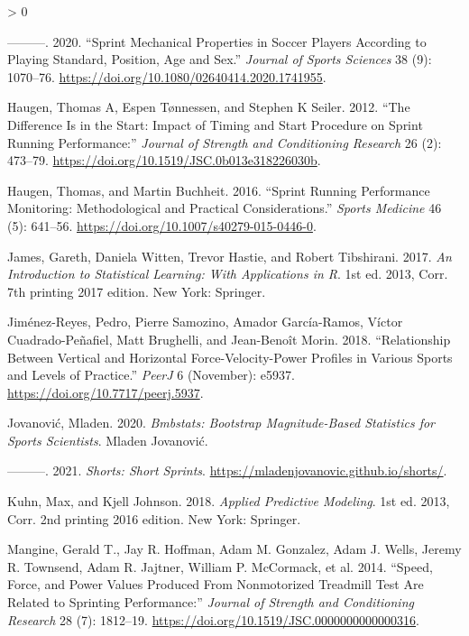 \documentclass[fleqn,10pt]{wlpeerj} %
\newlength{\cslhangindent}
\newenvironment{CSLReferences}[2] %
 {%
  \setlength{\parindent}{0pt}
  \ifodd #1 \everypar{\setlength{\hangindent}{\cslhangindent}}\ignorespaces\fi
  \ifnum #2 > 0
  \setlength{\parskip}{#2\baselineskip}
  \fi
 }%
 {}
\begin{document}
\begin{CSLReferences}{1}{0}
\leavevmode\hypertarget{ref-haugenSprintMechanicalProperties2020}{}%
---------. 2020. {``Sprint Mechanical Properties in Soccer Players According to Playing Standard, Position, Age and Sex.''} \emph{Journal of Sports Sciences} 38 (9): 1070--76. \url{https://doi.org/10.1080/02640414.2020.1741955}.

\leavevmode\hypertarget{ref-haugenDifferenceStartImpact2012}{}%
Haugen, Thomas A, Espen Tønnessen, and Stephen K Seiler. 2012. {``The {Difference Is} in the {Start}: {Impact} of {Timing} and {Start Procedure} on {Sprint Running Performance}:''} \emph{Journal of Strength and Conditioning Research} 26 (2): 473--79. \url{https://doi.org/10.1519/JSC.0b013e318226030b}.

\leavevmode\hypertarget{ref-haugenSprintRunningPerformance2016}{}%
Haugen, Thomas, and Martin Buchheit. 2016. {``Sprint {Running Performance Monitoring}: {Methodological} and {Practical Considerations}.''} \emph{Sports Medicine} 46 (5): 641--56. \url{https://doi.org/10.1007/s40279-015-0446-0}.

\leavevmode\hypertarget{ref-jamesIntroductionStatisticalLearning2017}{}%
James, Gareth, Daniela Witten, Trevor Hastie, and Robert Tibshirani. 2017. \emph{An {Introduction} to {Statistical Learning}: With {Applications} in {R}}. 1st ed. 2013, Corr. 7th printing 2017 edition. {New York}: {Springer}.

\leavevmode\hypertarget{ref-jimenez-reyesRelationshipVerticalHorizontal2018}{}%
Jiménez-Reyes, Pedro, Pierre Samozino, Amador García-Ramos, Víctor Cuadrado-Peñafiel, Matt Brughelli, and Jean-Benoît Morin. 2018. {``Relationship Between Vertical and Horizontal Force-Velocity-Power Profiles in Various Sports and Levels of Practice.''} \emph{PeerJ} 6 (November): e5937. \url{https://doi.org/10.7717/peerj.5937}.

\leavevmode\hypertarget{ref-jovanovicBmbstatsBootstrapMagnitudebased2020}{}%
Jovanović, Mladen. 2020. \emph{Bmbstats: {Bootstrap Magnitude}-Based {Statistics} for {Sports Scientists}}. {Mladen Jovanović}.

\leavevmode\hypertarget{ref-R-shorts}{}%
---------. 2021. \emph{Shorts: Short Sprints}. \url{https://mladenjovanovic.github.io/shorts/}.

\leavevmode\hypertarget{ref-kuhnAppliedPredictiveModeling2018}{}%
Kuhn, Max, and Kjell Johnson. 2018. \emph{Applied {Predictive Modeling}}. 1st ed. 2013, Corr. 2nd printing 2016 edition. {New York}: {Springer}.

\leavevmode\hypertarget{ref-mangineSpeedForcePower2014}{}%
Mangine, Gerald T., Jay R. Hoffman, Adam M. Gonzalez, Adam J. Wells, Jeremy R. Townsend, Adam R. Jajtner, William P. McCormack, et al. 2014. {``Speed, {Force}, and {Power Values Produced From Nonmotorized Treadmill Test Are Related} to {Sprinting Performance}:''} \emph{Journal of Strength and Conditioning Research} 28 (7): 1812--19. \url{https://doi.org/10.1519/JSC.0000000000000316}.


\end{CSLReferences}
\end{document}
